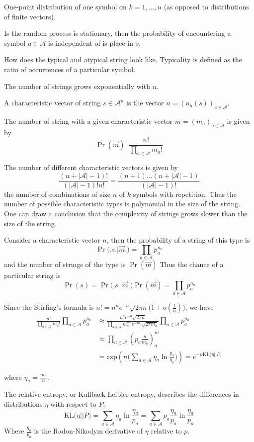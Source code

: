 \documentclass[a4paper]{article}
\newcommand{\brac}[1]{{\left ( #1 \right )}}
\newcommand{\abs}[1]{{\left | #1 \right |}}
\newcommand{\Acal}{\mathcal{A}}
\newcommand{\defn}{\mathop{\overset{\Delta}{=}}\nolimits}
\begin{document}
One-point distribution of one symbol on $k=1,\ldots,n$ (as opposed to distributions of finite vectors). 

Is the random process is stationary, then the probability of encountering a symbol $a\in \Acal$ is independent of is place in $s$.

How does the typical and atypical string look like. Typicality is defined as the ratio of occurrences of a particular symbol.

The number of strings grows exponentially with $n$.

A characteristic vector of string $s\in\Acal^n$ is the vector $n = \brac{n_a(s)}_{a\in \Acal}$.

The number of string with a given characteristic vector $m = \brac{m_a}_{a\in \Acal}$ is given by 
\[\Pr(\vec{m}) \defn \frac{n!}{\prod_{a\in \Acal} m_a!}\] 

The number of different characteristic vectors is given by 
\[\frac{(n+\abs{\Acal}-1)!}{(\abs{\Acal}-1)!n!} = \frac{(n+1)\ldots (n+\abs{\Acal}-1)}{(\abs{\Acal}-1)!}\]
the number of combinations of size $n$ of $k$ symbols with repetition.
Thus the number of possible characteristic types is polynomial in the size of the string. One can draw a conclusion that the complexity of strings grows slower than the size of the string.

Consider a characteristic vector $n$, then the probability of a string of this type is \[\Pr\Big(\Big. s \big.\big\rvert \vec{m}\Big.\Big) = \prod_{a\in \Acal} p_a^{n_a}\]
and the number of strings of the type is $\Pr(\vec{m})$
Thus the chance of a particular string is
\[\Pr(s) = \Pr\Big(\Big. s \big.\big\rvert \vec{m}\Big.\Big) \Pr(\vec{m}) = \prod_{a\in \Acal} p_a^{n_a}\]

Since the Stirling's formula is $n! = n^n e^{-n} \sqrt{2 \pi n} \big(1+o(\frac{1}{n})\big)$, we have
\begin{align*}
	\frac{n!}{\prod_{a\in \Acal} m_a!} \prod_{a\in \Acal} p_a^{n_a}
	& \approx \frac{n^n e^{-n} \sqrt{2 \pi n} }{\prod_{a\in \Acal} m_a^{m_a} e^{-m_a} \sqrt{2 \pi m_a} } \prod_{a\in \Acal} p_a^{n_a} \\
	& \approx \prod_{a\in \Acal} \brac{p_a \frac{n}{m_a}}^m_a \\
	& = \text{exp}\brac{ n \big( \sum_{a\in \Acal} \eta_a \ln\frac{p_a}{\eta_a} \big) } = e^{-n\text{KL}\big( \eta \lvert \rvert P\big)}
\end{align*}

where $\eta_a = \frac{m_a}{n}$. 

The relative entropy, or Kullback-Leibler entropy, describes the differences in distributions $\eta$ with respect to $P$:
\[\text{KL}\big( \eta \lvert \rvert P\big) = \sum_{a\in \Acal} \eta_a \ln \frac{\eta_a}{p_a} = \sum_{a\in \Acal} p_a \frac{\eta_a}{p_a} \ln \frac{\eta_a}{p_a} \]
Where $\frac{\eta_a}{p_a}$ is the Radon-Nikodym derivative of $\eta$ relative to $p$.
\end{document}
